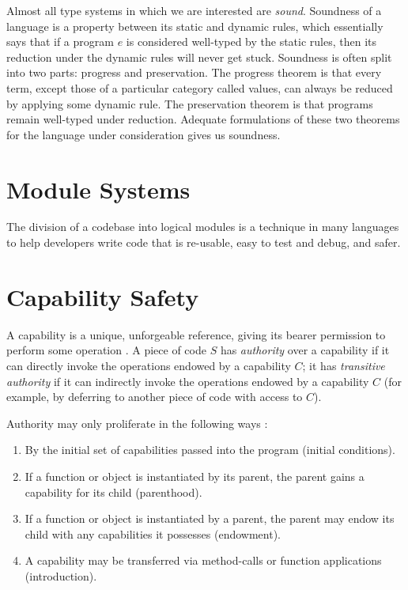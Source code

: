 Almost all type systems in which we are interested are \textit{sound}. Soundness of a language is a property between its static and dynamic rules, which essentially says that if a program $e$ is considered well-typed by the static rules, then its reduction under the dynamic rules will never get stuck. Soundness is often split into two parts: progress and preservation. The progress theorem is that every term, except those of a particular category called values, can always be reduced by applying some dynamic rule. The preservation theorem is that programs remain well-typed under reduction. Adequate formulations of these two theorems for the language under consideration gives us soundness. 

\section{Module Systems}

The division of a codebase into logical modules is a technique in many languages to help developers write code that is re-usable, easy to test and debug, and safer. 

\section{Capability Safety}

A capability is a unique, unforgeable reference, giving its bearer permission to perform some operation \cite{saltzer74}. A piece of code $S$ has \textit{authority} over a capability if it can directly invoke the operations endowed by a capability $C$; it has \textit{transitive authority} if it can indirectly invoke the operations endowed by a capability $C$ (for example, by deferring to another piece of code with access to $C$).

Authority may only proliferate in the following ways \cite{miller06}:

\begin{enumerate}
	\item By the initial set of capabilities passed into the program (initial conditions).
	\item If a function or object is instantiated by its parent, the parent gains a capability for its child (parenthood).
	\item If a function or object is instantiated by a parent, the parent may endow its child with any capabilities it possesses (endowment).
	\item A capability may be transferred via method-calls or function applications (introduction).
\end{enumerate}

